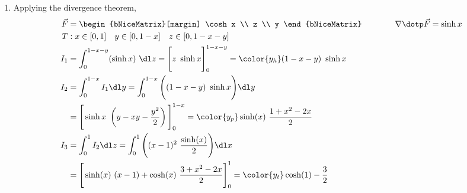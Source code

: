 \begin{enumerate}
    \item Applying the divergence theorem,
          \begin{align}
              \vec{F} & = \begin{bNiceMatrix}[margin]
                              \cosh x \\ z \\ y
                          \end{bNiceMatrix} \qquad\qquad
              \nabla \dotp \vec{F} = \sinh x                                       \\
              T       & : x \in [0, 1] \quad y \in [0, 1-x] \quad z \in [0, 1-x-y] \\
              I_1     & = \int_{0}^{1-x-y} (\sinh x)\ \dl z
              = \Bigg[ z\ \sinh x \Bigg]_{0}^{1-x-y}
              = {\color{y_h} (1 - x - y)\ \sinh x}                                 \\
              I_2     & = \int_{0}^{1-x}I_1 \dl y = \int_{0}^{1-x}
              \Bigg( (1-x-y)\ \sinh x \Bigg) \dl y                                 \\
                      & = \Bigg[ \sinh x\ \left( y - xy
                  - \frac{y^2}{2} \right) \Bigg]_{0}^{1-x}
              = {\color{y_p} \sinh(x)\ \frac{1+x^2 - 2x}{2}}                       \\
              I_3     & = \int_{0}^{1} I_2 \dl z = \int_{0}^{1}
              \Bigg( (x-1)^2\ \frac{\sinh(x)}{2} \Bigg) \dl x                      \\
                      & = \Bigg[ \sinh(x)\ (x-1) + \cosh(x)\
                  \frac{3 + x^2 - 2x}{2} \Bigg]_0^1
              = {\color{y_t} \cosh(1) - \frac{3}{2}}
          \end{align}


\end{enumerate}
